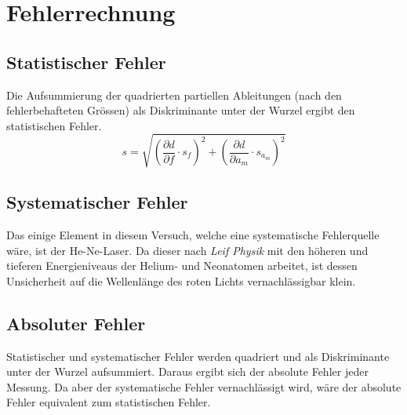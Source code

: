 \chapter{Fehlerrechnung}
\thispagestyle{fancy}
\section{Statistischer Fehler}
Die Aufsummierung der quadrierten partiellen Ableitungen (nach den fehlerbehafteten Grössen) als Diskriminante unter der Wurzel ergibt den statistischen Fehler.\\
\begin{equation}
s=\sqrt{\left( \frac{\partial d}{\partial f} \cdot s_{f}\right)^{2} +\left( \frac{\partial d}{\partial a_{m}} \cdot s_{a_{m}}\right)^{2}}
\label{eq:p3}
\end{equation}

\section{Systematischer Fehler}
Das einige Element in diesem Versuch, welche eine systematische Fehlerquelle wäre, ist der He-Ne-Laser. Da dieser nach \textit{Leif Physik} \cite{PhysikkeineAngaben} mit den höheren und tieferen Energieniveaus der Helium- und Neonatomen arbeitet, ist dessen Unsicherheit auf die Wellenlänge des roten Lichts vernachlässigbar klein. 
\section{Absoluter Fehler}
Statistischer und systematischer Fehler werden quadriert und als Diskriminante unter der Wurzel aufsummiert. Daraus ergibt sich der absolute Fehler jeder Messung. Da aber der systematische Fehler vernachlässigt wird, wäre der absolute Fehler equivalent zum statistischen Fehler.